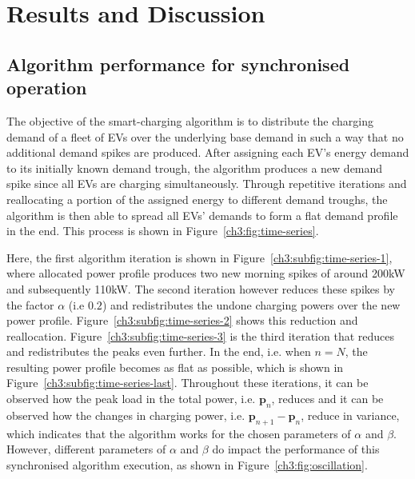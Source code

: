 \section{Results and Discussion}
\label{ch3:sec:results}

\subsection{Algorithm performance for synchronised operation}
\label{ch3:subsec:algorithm-performance-synchronised}

The objective of the smart-charging algorithm is to distribute the charging demand of a fleet of EVs over the underlying base demand in such a way that no additional demand spikes are produced.
After assigning each EV's energy demand to its initially known demand trough, the algorithm produces a new demand spike since all EVs are charging simultaneously.
Through repetitive iterations and reallocating a portion of the assigned energy to different demand troughs, the algorithm is then able to spread all EVs' demands to form a flat demand profile in the end.
This process is shown in Figure~\ref{ch3:fig:time-series}.



Here, the first algorithm iteration is shown in Figure~\ref{ch3:subfig:time-series-1}, where allocated power profile produces two new morning spikes of around 200kW and subsequently 110kW.
The second iteration however reduces these spikes by the factor $\alpha$ (i.e $0.2$) and redistributes the undone charging powers over the new power profile.
Figure~\ref{ch3:subfig:time-series-2} shows this reduction and reallocation.
Figure~\ref{ch3:subfig:time-series-3} is the third iteration that reduces and redistributes the peaks even further.
In the end, i.e. when $n=N$, the resulting power profile becomes as flat as possible, which is shown in Figure~\ref{ch3:subfig:time-series-last}.
Throughout these iterations, it can be observed how the peak load in the total power, i.e. $\textbf{p}_n$, reduces and it can be observed how the changes in charging power, i.e. $\textbf{p}_{n+1}-\textbf{p}_n$, reduce in variance, which indicates that the algorithm works for the chosen parameters of $\alpha$ and $\beta$.
However, different parameters of $\alpha$ and $\beta$ do impact the performance of this synchronised algorithm execution, as shown in Figure~\ref{ch3:fig:oscillation}.




